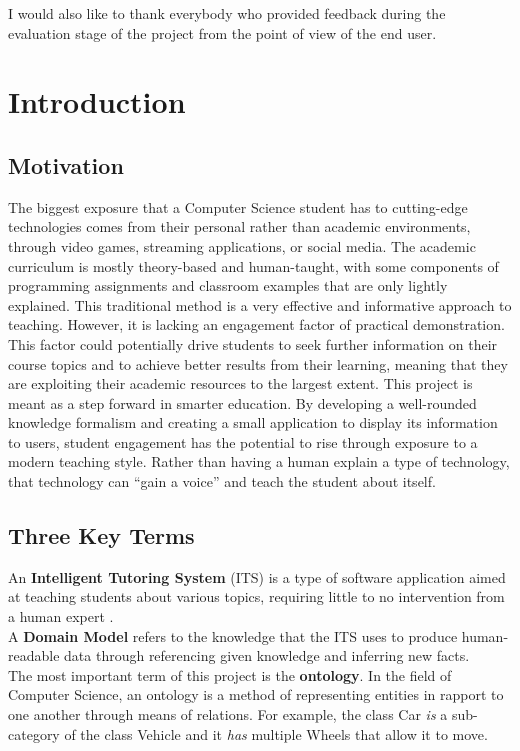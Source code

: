 \documentclass[12pt]{report}
\begin{document}
    I would also like to thank everybody who provided feedback during the evaluation stage of the project from the point of view of the end user.

	\newpage
	\tableofcontents

	\chapter{Introduction}

	\section{Motivation}
	The biggest exposure that a Computer Science student has to cutting-edge technologies comes from their personal rather than academic environments, through video games, streaming applications, or social media. The academic curriculum is mostly theory-based and human-taught, with some components of programming assignments and classroom examples that are only lightly explained.
    \newline
    This traditional method is a very effective and informative approach to teaching. However, it is lacking an engagement factor of practical demonstration. This factor could potentially drive students to seek further information on their course topics and to achieve better results from their learning, meaning that they are exploiting their academic resources to the largest extent.
    \newline
    This project is meant as a step forward in smarter education. By developing a well-rounded knowledge formalism and creating a small application to display its information to users, student engagement has the potential to rise through exposure to a modern teaching style. Rather than having a human explain a type of technology, that technology can ``gain a voice'' and teach the student about itself.

	\section{Three Key Terms}
	An \textbf{Intelligent Tutoring System} (ITS) is a type of software application aimed at teaching students about various topics, requiring little to no intervention from a human expert \cite{itsdefinition}.\\
    A \textbf{Domain Model} refers to the knowledge that the ITS uses to produce human-readable data through referencing given knowledge and inferring new facts.
    \\
    The most important term of this project is the \textbf{ontology}. In the field of Computer Science, an ontology is a method of representing entities in rapport to one another through means of relations. For example, the class Car \emph{is} a sub-category of the class Vehicle and it \emph{has} multiple Wheels that allow it to move.
	
\end{document}
